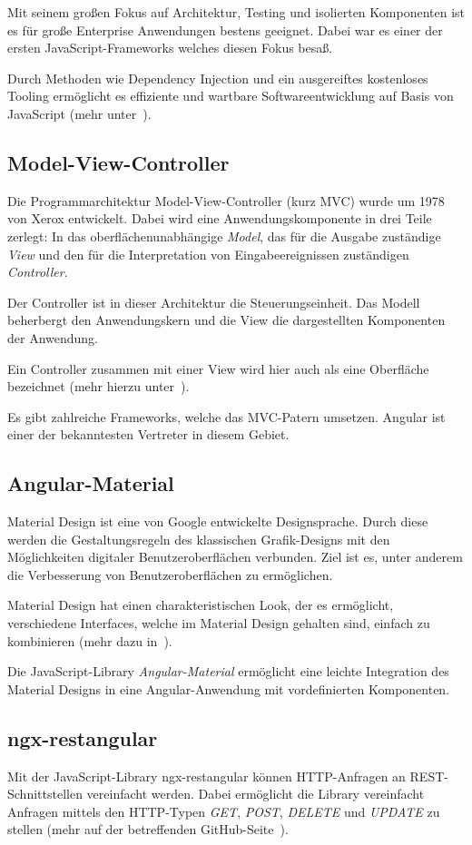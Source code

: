 Mit seinem großen Fokus auf Architektur, Testing und isolierten Komponenten ist es für große Enterprise Anwendungen
bestens geeignet. Dabei war es einer der ersten JavaScript-Frameworks welches diesen Fokus besaß.

Durch Methoden wie Dependency Injection und ein ausgereiftes kostenloses Tooling ermöglicht es effiziente und wartbare
Softwareentwicklung auf Basis von JavaScript (mehr unter~\cite{book_grundlagen_angular}).

\subsection{Model-View-Controller}
Die Programmarchitektur Model-View-Controller (kurz MVC) wurde um 1978 von Xerox entwickelt. Dabei wird eine
Anwendungskomponente in drei Teile zerlegt: In das oberflächenunabhängige \textit{Model}, das für die
Ausgabe zuständige \textit{View} und den für die Interpretation von Eingabeereignissen zuständigen \textit{Controller}.

Der Controller ist in dieser Architektur die Steuerungseinheit. Das Modell beherbergt den Anwendungskern und die View
die dargestellten Komponenten der Anwendung.

Ein Controller zusammen mit einer View wird hier auch als eine Oberfläche bezeichnet (mehr hierzu
unter~\cite{book_grundlagen_mvc}).

Es gibt zahlreiche Frameworks, welche das MVC-Patern umsetzen. Angular ist einer der bekanntesten Vertreter in diesem
Gebiet.

\subsection{Angular-Material}
Material Design ist eine von Google entwickelte Designsprache. Durch diese werden die Gestaltungsregeln des klassischen
Grafik-Designs mit den Möglichkeiten digitaler Benutzeroberflächen verbunden. Ziel ist es, unter anderem die Verbesserung
von Benutzeroberflächen zu ermöglichen.

Material Design hat einen charakteristischen Look, der es ermöglicht, verschiedene Interfaces, welche im Material Design
gehalten sind, einfach zu kombinieren (mehr dazu in~\cite{online_grundlagen_materialdesign}).

Die JavaScript-Library \textit{Angular-Material} ermöglicht eine leichte Integration des Material Designs in eine
Angular-Anwendung mit vordefinierten Komponenten.

\subsection{ngx-restangular}
Mit der JavaScript-Library ngx-restangular können HTTP-Anfragen an REST-Schnitt\-stellen vereinfacht werden. Dabei
ermöglicht die Library vereinfacht Anfragen mittels den HTTP-Typen \textit{GET}, \textit{POST}, \textit{DELETE} und
\textit{UPDATE} zu stellen (mehr auf der betreffenden GitHub-Seite~\cite{online_grundlagen_restangular}).

